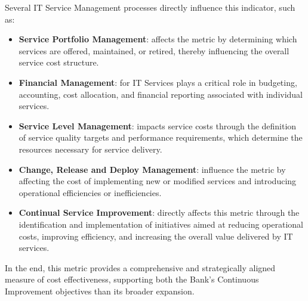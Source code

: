 Several IT Service Management processes directly influence this indicator, such as:
\begin{itemize}
    \item \textbf{Service Portfolio Management}: affects the metric by determining which services are offered, maintained, or retired, thereby influencing the overall service cost structure.
    \item \textbf{Financial Management}: for IT Services plays a critical role in budgeting, accounting, cost allocation, and financial reporting associated with individual services.
    \item \textbf{Service Level Management}: impacts service costs through the definition of service quality targets and performance requirements, which determine the resources necessary for service delivery.
    \item \textbf{Change, Release and Deploy Management}: influence the metric by affecting the cost of implementing new or modified services and introducing operational efficiencies or inefficiencies. 
    \item \textbf{Continual Service Improvement}: directly affects this metric through the identification and implementation of initiatives aimed at reducing operational costs, improving efficiency, and increasing the overall value delivered by IT services.

\end{itemize}
   

In the end, this metric provides a comprehensive and strategically aligned measure of cost effectiveness, supporting both the Bank's Continuous Improvement objectives than its broader expansion.


